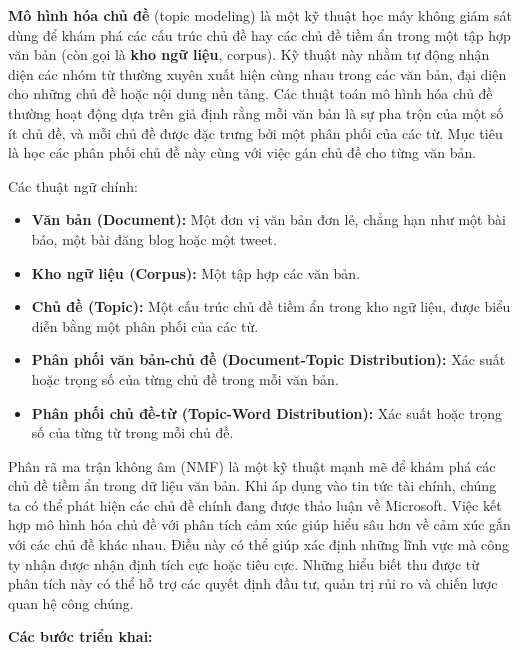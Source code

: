 \textbf{Mô hình hóa chủ đề} (topic modeling) là một kỹ thuật học máy không giám sát dùng để khám phá các cấu trúc chủ đề hay các chủ đề tiềm ẩn trong một tập hợp văn bản (còn gọi là \textbf{kho ngữ liệu}, corpus). Kỹ thuật này nhằm tự động nhận diện các nhóm từ thường xuyên xuất hiện cùng nhau trong các văn bản, đại diện cho những chủ đề hoặc nội dung nền tảng. Các thuật toán mô hình hóa chủ đề thường hoạt động dựa trên giả định rằng mỗi văn bản là sự pha trộn của một số ít chủ đề, và mỗi chủ đề được đặc trưng bởi một phân phối của các từ. Mục tiêu là học các phân phối chủ đề này cùng với việc gán chủ đề cho từng văn bản.

Các thuật ngữ chính:

\begin{itemize}
\item
  \textbf{Văn bản (Document):} Một đơn vị văn bản đơn lẻ, chẳng hạn như một bài báo, một bài đăng blog hoặc một tweet.
\item
  \textbf{Kho ngữ liệu (Corpus):} Một tập hợp các văn bản.
\item
  \textbf{Chủ đề (Topic):} Một cấu trúc chủ đề tiềm ẩn trong kho ngữ liệu, được biểu diễn bằng một phân phối của các từ.
\item
  \textbf{Phân phối văn bản-chủ đề (Document-Topic Distribution):} Xác suất hoặc trọng số của từng chủ đề trong mỗi văn bản.
\item
  \textbf{Phân phối chủ đề-từ (Topic-Word Distribution):} Xác suất hoặc trọng số của từng từ trong mỗi chủ đề.
\end{itemize}

Phân rã ma trận không âm (NMF) là một kỹ thuật mạnh mẽ để khám phá các chủ đề tiềm ẩn trong dữ liệu văn bản. Khi áp dụng vào tin tức tài chính, chúng ta có thể phát hiện các chủ đề chính đang được thảo luận về Microsoft. Việc kết hợp mô hình hóa chủ đề với phân tích cảm xúc giúp hiểu sâu hơn về cảm xúc gắn với các chủ đề khác nhau. Điều này có thể giúp xác định những lĩnh vực mà công ty nhận được nhận định tích cực hoặc tiêu cực. Những hiểu biết thu được từ phân tích này có thể hỗ trợ các quyết định đầu tư, quản trị rủi ro và chiến lược quan hệ công chúng.

\textbf{Các bước triển khai:}

